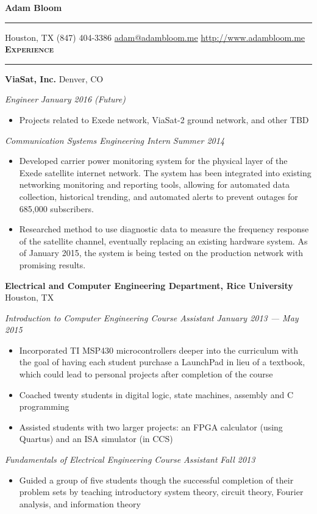 \documentclass[10pt,letterpaper]{article}
\newcommand{\printName}[1]{
{\huge \textbf{#1}}
\vspace{0.25em}
\hrule
\vspace{0.25em}
}
\newenvironment{resumeSection}[1]{
{\Large \textbf{\textsc{#1}}}
\vspace{0.25em}
\hrule
\vspace{0.5em}
}{

}
\newenvironment{employer}[2]{
{\large \textbf{#1} \hfill #2} \newline
}{
\vspace{0.5em}
}
\newenvironment{position}[2]{
{\large \emph{#1} \hfill \emph{#2}}
\begin{itemize}[noitemsep,topsep=0pt]
}{
\end{itemize}
\vspace{0.5em}
}
\begin{document}
\printName{Adam Bloom}
Houston, TX \hfill (847) 404-3386 \hfill \href{mailto:adam@adambloom.me}{adam@adambloom.me} \hfill \href{http://www.adambloom.me}{http://www.adambloom.me}
\vspace{0.5em} \newline
\begin{resumeSection}{Experience}
\begin{employer}{ViaSat, Inc.}{Denver, CO}
\begin{position}{Engineer}{January 2016 (Future)}
\item Projects related to Exede network, ViaSat-2 ground network, and other TBD
\end{position}
\begin{position}{Communication Systems Engineering Intern}{Summer 2014}
\item Developed carrier power monitoring system for the physical layer of the Exede satellite internet network. The system has been integrated into existing networking monitoring and reporting tools, allowing for automated data collection, historical trending, and automated alerts to prevent outages for 685,000 subscribers.
    \item Researched method to use diagnostic data to measure the frequency response of the satellite channel, eventually replacing an existing hardware system. As of January 2015, the system is being tested on the production network with promising results.
\end{position}
\end{employer}

\begin{employer}{Electrical and Computer Engineering Department, Rice University}{Houston, TX}
\begin{position}{Introduction to Computer Engineering Course Assistant}{January 2013 --- May 2015}
\item Incorporated TI MSP430 microcontrollers deeper into the curriculum with the goal of having each student purchase a LaunchPad in lieu of a textbook, which could lead to personal projects after completion of the course
\item Coached twenty students in digital logic, state machines, assembly and C programming
\item Assisted students with two larger projects: an FPGA calculator (using Quartus) and an ISA simulator (in CCS)
\end{position}
\begin{position}{Fundamentals of Electrical Engineering Course Assistant}{Fall 2013}
\item Guided a group of five students though the successful completion of their problem sets by teaching introductory system theory, circuit theory, Fourier analysis, and information theory
\end{position}
\end{employer}


\end{resumeSection}
\end{document}
